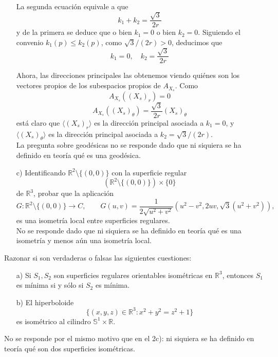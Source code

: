 \documentclass[12pt]{article}
\begin{document}
\begin{ejercicio}
\begin{enumerate}
            La segunda ecuación equivale a que $$k_1 + k_2 = \dfrac{\sqrt{3}}{2r}$$
            y de la primera se deduce que o bien $k_1 = 0$ o bien $k_2 = 0$. Siguiendo el convenio $k_1(p) \leq k_2(p)$, como $\sqrt{3}/(2r) > 0$, 
            deducimos que 
            $$\boxed{k_1 = 0, \quad k_2 = \dfrac{\sqrt{3}}{2r}}$$

            Ahora, las direcciones principales las obtenemos viendo quiénes son los vectores propios de los subespacios propios de $A_{X_s}$. Como
            $$A_{X_s}((X_s)_r) = 0$$
            $$A_{X_s}((X_s)_\theta) = \dfrac{\sqrt{3}}{2r} (X_s)_\theta$$
            está claro que $\langle (X_s)_r \rangle$ es la dirección principal asociada a $k_1 = 0$, y $\langle (X_s)_\theta \rangle$ es la dirección
            principal asociada a $k_2 = \sqrt{3}/(2r)$. \\

            La pregunta sobre geodésicas no se responde dado que ni siquiera se ha definido en teoría qué es una geodésica.

            \item[c)] Identificando $\mathbb{R}^2\setminus\{(0,0)\}$ con la superficie regular
            $$(\mathbb{R}^2\setminus\{(0,0)\})\times\{0\}$$
            de $\mathbb{R}^3$, probar que la aplicación
            $$
            G:\mathbb{R}^2\setminus\{(0,0)\}\longrightarrow C,
            \qquad
            G(u,v)=\frac{1}{2\sqrt{u^2+v^2}}(u^2-v^2,2uv,\sqrt{3}(u^2+v^2)),
            $$
            es una isometría local entre superficies regulares. \\

            No se responde dado que ni siquiera se ha definido en teoría qué es una isometría y menos aún una isometría local.
        \end{enumerate}
    \end{ejercicio}

    \newpage

    \begin{ejercicio}
        Razonar si son verdaderas o falsas las siguientes cuestiones:

        \begin{enumerate}
            \item[a)] Si $S_1,S_2$ son superficies regulares orientables isométricas en $\mathbb{R}^3$, entonces $S_1$ es mínima si y sólo si $S_2$ es mínima$.$

            \item[b)] El hiperboloide $$\{(x,y,z)\in\mathbb{R}^3:x^2+y^2=z^2+1\}$$ es isométrico al cilindro 
            $\mathbb{S}^1\times \mathbb{R}$.
        \end{enumerate}

        No se responde por el mismo motivo que en el 2c): ni siquiera se ha definido en teoría qué son dos superficies isométricas.
    \end{ejercicio}
\end{document}

